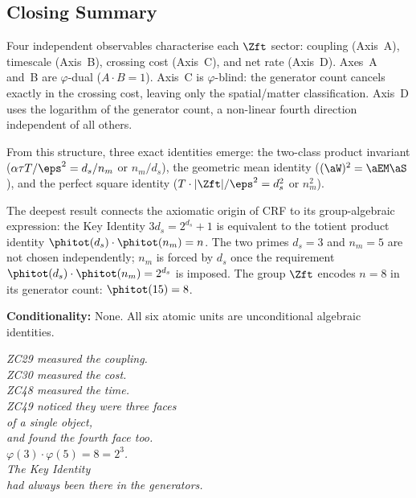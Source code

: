 \documentclass[12pt, a4paper]{article}
\begin{document}
\subsection*{Closing Summary}

\begin{keybox}
Four independent observables characterise each $\Zft$ sector:
coupling (Axis~A), timescale (Axis~B), crossing cost (Axis~C),
and net rate (Axis~D).
Axes~A and~B are $\varphi$-dual ($A\cdot B = 1$).
Axis~C is $\varphi$-blind: the generator count cancels exactly
in the crossing cost, leaving only the spatial/matter
classification.
Axis~D uses the logarithm of the generator count, a
non-linear fourth direction independent of all others.

From this structure, three exact identities emerge:
the two-class product invariant ($\alpha\tau T/\eps^2
= d_s/n_m$ or $n_m/d_s$),
the geometric mean identity ($(\aW)^2 = \aEM\aS$),
and the perfect square identity ($T\cdot|\Zft|/\eps^2
= d_s^2$ or $n_m^2$).

The deepest result connects the axiomatic origin of CRF to
its group-algebraic expression: the Key Identity
$3d_s = 2^{d_s}+1$ is equivalent to the totient product
identity $\phitot(d_s)\cdot\phitot(n_m) = n$.
The two primes $d_s = 3$ and $n_m = 5$ are not chosen
independently; $n_m$ is forced by $d_s$ once the
requirement $\phitot(d_s)\cdot\phitot(n_m) = 2^{d_s}$
is imposed.
The group $\Zft$ encodes $n = 8$ in its generator count:
$\phitot(15) = 8$.

\medskip
\textbf{Conditionality:} None.
All six atomic units are unconditional algebraic identities.
\end{keybox}

\bigskip
\begin{center}
\textit{%
ZC29 measured the coupling.\\[0.3em]
ZC30 measured the cost.\\[0.3em]
ZC48 measured the time.\\[0.3em]
ZC49 noticed they were three faces\\
of a single object,\\
and found the fourth face too.\\[0.5em]
$\varphi(3)\cdot\varphi(5) = 8 = 2^3$.\\[0.3em]
The Key Identity\\
had always been there in the generators.}
\end{center}
\end{document}
